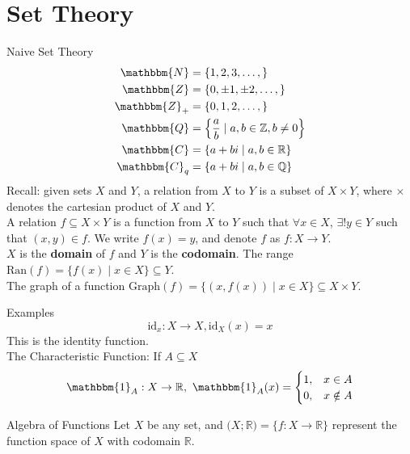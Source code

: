 \documentclass[10pt]{extarticle}
\title{}
\author{Avinash Iyer}
\date{}
\begin{document}
\section*{Set Theory}%
  \begin{problem}{Naive Set Theory}
    \begin{align*}
      \mathbbm{N} &= \{1,2,3,\dots,\}\\
      \mathbbm{Z} &= \{0,\pm1,\pm2,\dots,\} \\
      \mathbbm{Z}_+ &= \{0,1,2,\dots,\}\\
      \mathbbm{Q} &= \left\{\frac{a}{b} \mid a,b\in\mathbb{Z},b\neq 0\right\}\\
      \mathbbm{C} &= \{a+bi \mid a,b\in \mathbb{R}\}\\
      \mathbbm{C}_q &= \{a+bi \mid a,b\in \mathbb{Q}\}
    \end{align*}
    Recall: given sets $X$ and $Y$, a relation from $X$ to $Y$ is a subset of $X\times Y$, where $\times$ denotes the cartesian product of $X$ and $Y$.\\

    A relation $f\subseteq X\times Y$ is a function from $X$ to $Y$ such that $\forall x\in X$, $\exists!y\in Y$ such that $(x,y) \in f$. We write $f(x) = y$, and denote $f$ as $f:X\rightarrow Y$.\\

    $X$ is the \textbf{domain} of $f$ and $Y$ is the \textbf{codomain}. The range $\text{Ran}(f) = \{f(x)\mid x\in X\}\subseteq Y$. \\

    The graph of a function $\text{Graph}(f) = \{(x,f(x))\mid x\in X\} \subseteq X\times Y$.
    \begin{problem}{Examples}
      \[\text{id}_x: X\rightarrow X, \text{id}_X(x) = x\]
      This is the identity function.\\

      The Characteristic Function: If $A\subseteq X$
      \[\mathbbm{1}_A: X\rightarrow \mathbb{R}, ~\mathbbm{1}_A(x) = \begin{cases}
        1,&x\in A\\
        0,&x\notin A
      \end{cases}\]
    \end{problem}
    \begin{problem}{Algebra of Functions}
      Let $X$ be any set, and $\mathcal(X;\mathbb{R}) = \{f:X\rightarrow \mathbb{R}\}$ represent the function space of $X$ with codomain $\mathbb{R}$.\\


\end{problem}
\end{problem}
\end{document}
